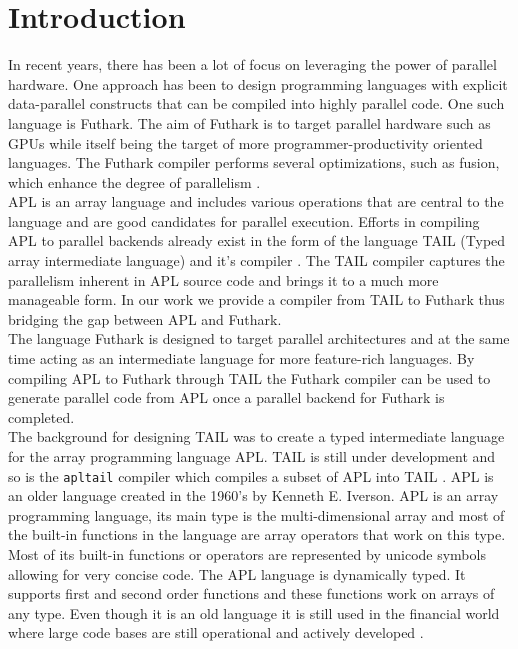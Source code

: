 \documentclass[11pt]{article}
\begin{document}
\section{Introduction}
In recent years, there has been a lot of focus on leveraging the power of parallel hardware. 
One approach has been to design programming languages with explicit data-parallel constructs that can be compiled 
into highly parallel code. One such language is Futhark. The aim of Futhark is to target parallel hardware such as 
GPUs while itself being the target of more programmer-productivity oriented languages. The Futhark compiler 
performs several optimizations, such as fusion, which enhance the degree of 
parallelism \cite{T.Henriksen&C.Oancea}.\\

APL is an array language and includes various operations that are central to the language and are good candidates 
for parallel execution. Efforts in compiling APL to parallel backends already exist in the form of the language 
TAIL (Typed array intermediate language) and it’s compiler \cite{ElsmanDybdal:Array:2014}.
The TAIL compiler captures the parallelism inherent in APL source code and brings it to a much more manageable form.
In our work we provide a compiler from TAIL 
to Futhark thus bridging the gap between APL and Futhark.\\

The language Futhark is designed to target parallel architectures and at the same time acting 
as an intermediate language for more feature-rich languages. By compiling APL to Futhark through TAIL the 
Futhark compiler can be used to generate parallel code from APL once a parallel backend for 
Futhark is completed.\\

The background for designing TAIL was to create a typed intermediate language for the array programming language APL.
TAIL is still under development and so is the {\tt apltail} compiler which compiles a subset of APL into
TAIL \cite{ElsmanDybdal:Array:2014}.
APL is an older language created in the 1960's by Kenneth E. Iverson.
APL is an array programming language, its main type is the multi-dimensional array 
and most of the built-in functions in the language are array operators that work on this type. 
Most of its built-in functions or operators are represented by unicode symbols allowing for very concise code.
The APL language is dynamically typed. It supports first and second order functions and these functions work on arrays of any type. 
Even though it is an old language it is still used in the financial world 
where large code bases are still operational and actively developed \cite{ElsmanDybdal:Array:2014}. \\
\end{document}
